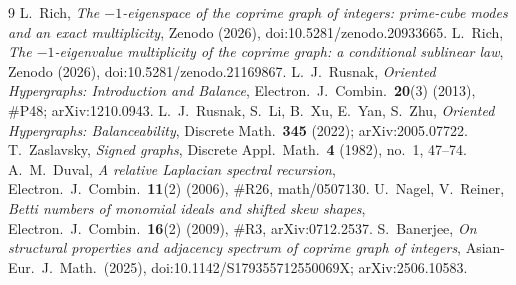 \documentclass[11pt,reqno]{amsart}
\theoremstyle{plain}
\theoremstyle{definition}
\theoremstyle{plain}
\theoremstyle{definition}
\begin{document}
\begin{thebibliography}{9}
 L.~Rich, \emph{The $-1$-eigenspace of the coprime graph of integers:
prime-cube modes and an exact multiplicity}, Zenodo (2026), doi:10.5281/zenodo.20933665.
 L.~Rich, \emph{The $-1$-eigenvalue multiplicity of the coprime graph:
a conditional sublinear law}, Zenodo (2026), doi:10.5281/zenodo.21169867.
 L.~J.~Rusnak, \emph{Oriented Hypergraphs: Introduction and Balance},
Electron.\ J.\ Combin.\ \textbf{20}(3) (2013), \#P48; arXiv:1210.0943.
 L.~J.~Rusnak, S.~Li, B.~Xu, E.~Yan, S.~Zhu, \emph{Oriented Hypergraphs:
Balanceability}, Discrete Math.\ \textbf{345} (2022); arXiv:2005.07722.
 T.~Zaslavsky, \emph{Signed graphs}, Discrete Appl.\ Math.\ \textbf{4} (1982),
no.~1, 47--74.
 A.~M.~Duval, \emph{A relative Laplacian spectral recursion}, Electron.\ J.\
Combin.\ \textbf{11}(2) (2006), \#R26, math/0507130.
 U.~Nagel, V.~Reiner, \emph{Betti numbers of monomial ideals and shifted
skew shapes}, Electron.\ J.\ Combin.\ \textbf{16}(2) (2009), \#R3, arXiv:0712.2537.
\bibitem{Banerjee2025} S.~Banerjee, \emph{On structural properties and adjacency spectrum of
coprime graph of integers}, Asian-Eur.\ J.\ Math.\ (2025), doi:10.1142/S179355712550069X;
arXiv:2506.10583.
\end{thebibliography}
\end{document}
